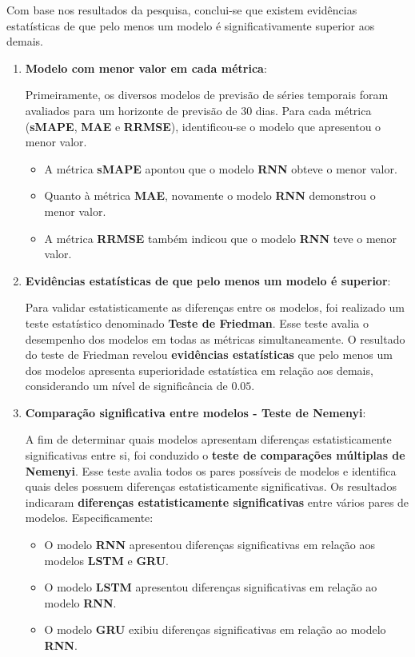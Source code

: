 Com base nos resultados da pesquisa, conclui-se que existem evidências estatísticas de que pelo menos um modelo é significativamente superior aos demais.




\begin{enumerate}
	\item \textbf{Modelo com menor valor em cada métrica}:
	
	Primeiramente, os diversos modelos de previsão de séries temporais foram avaliados para um horizonte de previsão de 30 dias. Para cada métrica (\textbf{sMAPE}, \textbf{MAE} e \textbf{RRMSE}), identificou-se o modelo que apresentou o menor valor.
\begin{itemize}
	\item A métrica \textbf{sMAPE} apontou que o modelo \textbf{RNN} obteve o menor valor.
	\item Quanto à métrica \textbf{MAE}, novamente o modelo \textbf{RNN} demonstrou o menor valor.
	\item A métrica \textbf{RRMSE} também indicou que o modelo \textbf{RNN} teve o menor valor.
\end{itemize}

	\item \textbf{Evidências estatísticas de que pelo menos um modelo é superior}:

	Para validar estatisticamente as diferenças entre os modelos, foi realizado um teste estatístico denominado \textbf{Teste de Friedman}. Esse teste avalia o desempenho dos modelos em todas as métricas simultaneamente. O resultado do teste de Friedman revelou \textbf{evidências estatísticas} que pelo menos um dos modelos apresenta superioridade estatística em relação aos demais, considerando um nível de significância de $0.05$.
	
	\item  \textbf{Comparação significativa entre modelos - Teste de Nemenyi}:
	
	A fim de determinar quais modelos apresentam diferenças estatisticamente significativas entre si, foi conduzido o \textbf{teste de comparações múltiplas de Nemenyi}. Esse teste avalia todos os pares possíveis de modelos e identifica quais deles possuem diferenças estatisticamente significativas. Os resultados indicaram \textbf{diferenças estatisticamente significativas} entre vários pares de modelos. Especificamente:
	\begin{itemize}
		\item O modelo \textbf{RNN} apresentou diferenças significativas em relação aos modelos \textbf{LSTM} e \textbf{GRU}.
		\item  O modelo \textbf{LSTM} apresentou diferenças significativas em relação ao modelo \textbf{RNN}.
		\item O modelo \textbf{GRU} exibiu diferenças significativas em relação ao modelo \textbf{RNN}.
	\end{itemize}
\end{enumerate}


